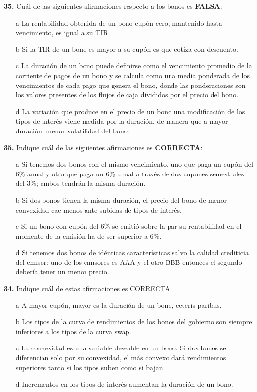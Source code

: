 \documentclass{nuevotema}
\begin{document}
\textbf{35.} Cuál de las siguientes afirmaciones respecto a los bonos es \textbf{FALSA}:
\begin{enumerate}
	\item[a] La rentabilidad obtenida de un bono cupón cero, mantenido hasta vencimiento, es igual a su TIR.
	\item[b] Si la TIR de un bono es mayor a su cupón es que cotiza con descuento.
	\item[c] La duración de un bono puede definirse como el vencimiento promedio de la corriente de pagos de un bono y se calcula como una media ponderada de los vencimientos de cada pago que genera el bono, donde las ponderaciones son los valores presentes de los flujos de caja divididos por el precio del bono.
	\item[d] La variación que produce en el precio de un bono una modificación de los tipos de interés viene medida por la duración, de manera que a mayor duración, menor volatilidad del bono.
\end{enumerate}

\textbf{35.} Indique cuál de las siguientes afirmaciones es \textbf{CORRECTA}:
\begin{enumerate}
	\item[a] Si tenemos dos bonos con el mismo vencimiento, uno que paga un cupón del 6\% anual y otro que paga un 6\% anual a través de dos cupones semestrales del 3\%; ambos tendrán la misma duración.
	\item[b] Si dos bonos tienen la misma duración, el precio del bono de menor convexidad cae menos ante subidas de tipos de interés.
	\item[c] Si un bono con cupón del 6\% se emitió sobre la par su rentabilidad en el momento de la emisión ha de ser superior a 6\%.
	\item[d] Si tenemos dos bonos de idénticas características salvo la calidad crediticia del emisor: uno de los emisores es AAA y el otro BBB entonces el segundo debería tener un menor precio.
\end{enumerate}

\textbf{34.} Indique cuál de estas afirmaciones es CORRECTA:
\begin{enumerate}
	\item[a] A mayor cupón, mayor es la duración de un bono, ceteris paribus.
	\item[b] Los tipos de la curva de rendimientos de los bonos del gobierno son siempre inferiores a los tipos de la curva swap.
	\item[c] La convexidad es una variable deseable en un bono. Si dos bonos se diferencian solo por su convexidad, el más convexo dará rendimientos superiores tanto si los tipos suben como si bajan.
	\item[d] Incrementos en los tipos de interés aumentan la duración de un bono.
\end{enumerate}
\end{document}
